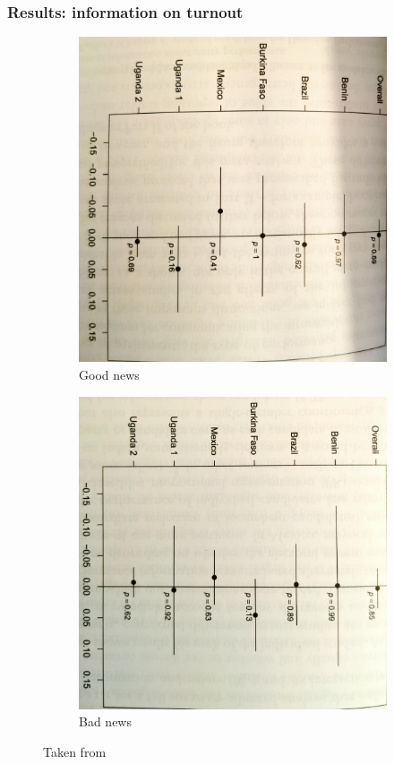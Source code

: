 \documentclass[12pt,english,dvipsnames,aspectratio=169,handout]{beamer}\usepackage[]{graphicx}\usepackage[]{xcolor}
\begin{document}
\begin{frame}
	\frametitle{Results: information on turnout}
	
	\begin{figure}
		\centering
		\begin{subfigure}{0.47\linewidth}
			\includegraphics[scale=0.075,angle=90]{../04-figures/12/02-Good-news-choice.jpg}
			\caption{Good news}
		\end{subfigure}
	    \begin{subfigure}{0.47\linewidth}
	    	\includegraphics[scale=0.074,angle=90]{../04-figures/12/03-Bad-news-choice.jpg}
	    	\caption{Bad news}
	    \end{subfigure}
    \caption{Taken from }
	\end{figure}
	

\end{frame}
\end{document}
